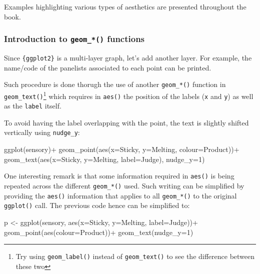 \documentclass[
]{book}
\newenvironment{Shaded}{\begin{snugshade}}{\end{snugshade}}
\newcommand{\AttributeTok}[1]{\textcolor[rgb]{0.77,0.63,0.00}{#1}}
\newcommand{\DecValTok}[1]{\textcolor[rgb]{0.00,0.00,0.81}{#1}}
\newcommand{\FunctionTok}[1]{\textcolor[rgb]{0.00,0.00,0.00}{#1}}
\newcommand{\NormalTok}[1]{#1}
\newcommand{\OtherTok}[1]{\textcolor[rgb]{0.56,0.35,0.01}{#1}}
\newcommand{\SpecialCharTok}[1]{\textcolor[rgb]{0.00,0.00,0.00}{#1}}
\begin{document}
Examples highlighting various types of aesthetics are presented throughout the book.

\hypertarget{introduction-to-geom_-functions}{%
\subsubsection{\texorpdfstring{Introduction to \texttt{geom\_*()} functions}{Introduction to geom\_*() functions}}\label{introduction-to-geom_-functions}}

Since \texttt{\{ggplot2\}} is a multi-layer graph, let's add another layer. For example, the name/code of the panelists associated to each point can be printed.

Such procedure is done thorugh the use of another \texttt{geom\_*()} function in \texttt{geom\_text()}\footnote{Try using \texttt{geom\_label()} instead of \texttt{geom\_text()} to see the difference between these two} which requires in \texttt{aes()} the position of the labels (\texttt{x} and \texttt{y}) as well as the \texttt{label} itself.

To avoid having the label overlapping with the point, the text is slightly shifted vertically using \texttt{nudge\_y}:

\begin{Shaded}
\begin{Highlighting}[]
\FunctionTok{ggplot}\NormalTok{(sensory)}\SpecialCharTok{+}
  \FunctionTok{geom\_point}\NormalTok{(}\FunctionTok{aes}\NormalTok{(}\AttributeTok{x=}\NormalTok{Sticky, }\AttributeTok{y=}\NormalTok{Melting, }\AttributeTok{colour=}\NormalTok{Product))}\SpecialCharTok{+}
  \FunctionTok{geom\_text}\NormalTok{(}\FunctionTok{aes}\NormalTok{(}\AttributeTok{x=}\NormalTok{Sticky, }\AttributeTok{y=}\NormalTok{Melting, }\AttributeTok{label=}\NormalTok{Judge), }\AttributeTok{nudge\_y=}\DecValTok{1}\NormalTok{)}
\end{Highlighting}
\end{Shaded}

One interesting remark is that some information required in \texttt{aes()} is being repeated across the different \texttt{geom\_*()} used. Such writing can be simplified by providing the \texttt{aes()} information that applies to all \texttt{geom\_*()} to the original \texttt{ggplot()} call. The previous code hence can be simplified to:

\begin{Shaded}
\begin{Highlighting}[]
\NormalTok{p }\OtherTok{\textless{}{-}} \FunctionTok{ggplot}\NormalTok{(sensory, }\FunctionTok{aes}\NormalTok{(}\AttributeTok{x=}\NormalTok{Sticky, }\AttributeTok{y=}\NormalTok{Melting, }\AttributeTok{label=}\NormalTok{Judge))}\SpecialCharTok{+}
  \FunctionTok{geom\_point}\NormalTok{(}\FunctionTok{aes}\NormalTok{(}\AttributeTok{colour=}\NormalTok{Product))}\SpecialCharTok{+}
  \FunctionTok{geom\_text}\NormalTok{(}\AttributeTok{nudge\_y=}\DecValTok{1}\NormalTok{)}
\end{Highlighting}
\end{Shaded}
\end{document}

